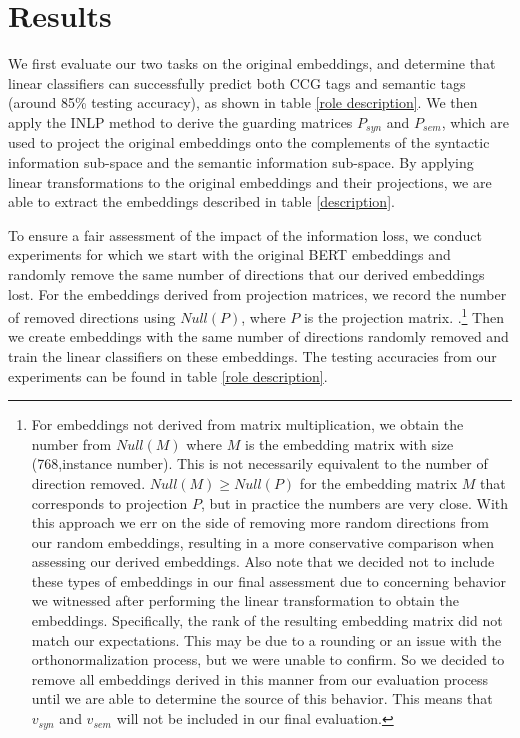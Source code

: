 \documentclass[11pt,a4paper]{article}
\begin{document}
\section{Results}
\label{sec:result}

We first evaluate our two tasks on the original embeddings, and determine that linear classifiers can successfully predict both CCG tags and semantic tags (around 85\% testing accuracy), as shown in table \ref{role description}. We then apply the INLP method to derive the guarding matrices $P_{syn}$ and $P_{sem}$, which are used to project the original embeddings onto the complements of the syntactic information sub-space and the semantic information sub-space. By applying linear transformations to the original embeddings and their projections, we are able to extract the embeddings described in table \ref{description}. 

To ensure a fair assessment of the impact of the information loss, we conduct experiments for which we start with the original BERT embeddings and randomly remove the same number of directions that our derived embeddings lost. For the embeddings derived from projection matrices, we record the number of removed directions using $Null(P)$, where $P$ is the projection matrix. .\footnote{For embeddings not derived from matrix multiplication, we obtain the number from $Null(M)$ where $M$ is the embedding matrix with size (768,instance number). This is not necessarily equivalent to the number of direction removed. $Null(M) \geq Null(P)$ for the embedding matrix $M$ that corresponds to projection $P$, but in practice the numbers are very close. With this approach we err on the side of removing more random directions from our random embeddings, resulting in a more conservative comparison when assessing our derived embeddings. Also note that we decided not to include these types of embeddings in our final assessment due to concerning behavior we witnessed after performing the linear transformation to obtain the embeddings. Specifically, the rank of the resulting embedding matrix did not match our expectations. This may be due to a rounding or an issue with the orthonormalization process, but we were unable to confirm. So we decided to remove all embeddings derived in this manner from our evaluation process until we are able to determine the source of this behavior. This means that $v_{syn}$ and $v_{sem}$ will not be included in our final evaluation.} Then we create embeddings with the same number of directions randomly removed and train the linear classifiers on these embeddings. The testing accuracies from our experiments can be found in table \ref{role description}.
\end{document}
